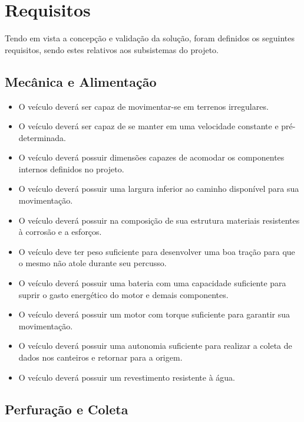 \chapter{Requisitos}

  Tendo em vista a concepção e validação da solução, foram definidos os seguintes
  requisitos, sendo estes relativos aos subsistemas do projeto.

  \section{Mecânica e Alimentação}

    \begin{itemize}
      \item O veículo deverá ser capaz de movimentar-se em terrenos irregulares.
      \item O veículo deverá ser capaz de se manter em uma velocidade constante e pré-determinada.
      \item O veículo deverá possuir dimensões capazes de acomodar os componentes internos definidos no projeto.
      \item O veículo deverá possuir uma largura inferior ao caminho disponível para sua movimentação.
      \item O veículo deverá possuir na composição de sua estrutura materiais resistentes à corrosão e a esforços.
      \item O veículo deve ter peso suficiente para desenvolver uma boa tração para que o mesmo não atole durante seu percusso.
      \item O veículo deverá possuir uma bateria com uma capacidade suficiente para suprir o gasto energético do motor e demais componentes.
      \item O veículo deverá possuir um motor com torque suficiente para garantir sua movimentação.
      \item O veículo deverá possuir uma autonomia suficiente para realizar a coleta de dados nos canteiros e retornar para a origem.
      \item O veículo deverá possuir um revestimento resistente à água.
    \end{itemize}

\vfill
\pagebreak

  \section{Perfuração e Coleta}

